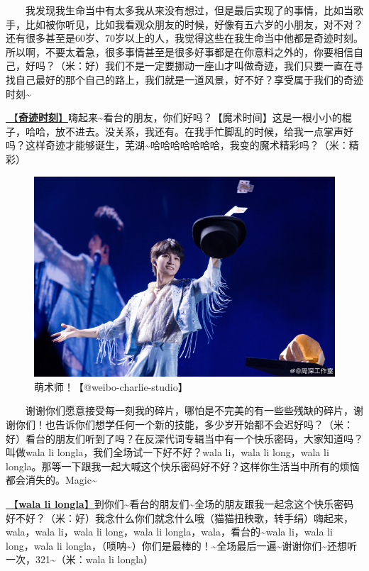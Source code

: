 \documentclass[]{ctexbook}
\begin{document}
  我发现我生命当中有太多我从来没有想过，但是最后实现了的事情，比如当歌手，比如被你听见，比如我看观众朋友的时候，好像有五六岁的小朋友，对不对？还有很多甚至是60岁、70岁以上的人，我觉得这些在我生命当中他都是奇迹时刻。所以啊，不要太着急，很多事情甚至是很多好事都是在你意料之外的，你要相信自己，好吗？（米：好）我们不是一定要挪动一座山才叫做奇迹，我们只要一直在寻找自己最好的那个自己的路上，我们就是一道风景，好不好？享受属于我们的奇迹时刻\textasciitilde{}

\hyperref[magic-moment]{🎵【\textbf{奇迹时刻}】}嗨起来\textasciitilde 看台的朋友，你们好吗？【魔术时间】这是一根小小的棍子，哈哈，放不进去。没关系，我还有。在我手忙脚乱的时候，给我一点掌声好吗？这样奇迹才能够诞生，芜湖\textasciitilde 哈哈哈哈哈哈哈，我变的魔术精彩吗？（米：精彩）

\begin{figure}

{\centering \includegraphics[width=400pt]{img/shenyang20240907/001} 

}

\caption{萌术师！【@weibo-charlie-studio】}\label{fig:unnamed-chunk-92}
\end{figure}

  谢谢你们愿意接受每一刻我的碎片，哪怕是不完美的有一些些残缺的碎片，谢谢你们！也告诉你们想学任何一个新的技能，多少岁开始都不会迟好吗？（米：好）看台的朋友们听到了吗？在反深代词专辑当中有一个快乐密码，大家知道吗？叫做wala li longla，我们全场试一下好不好？wala li，wala li long，wala li longla。那等一下跟我一起大喊这个快乐密码好不好？这样你生活当中所有的烦恼都会消失的。Magic\textasciitilde{}

\hyperref[wala-li-longla]{🎵【\textbf{wala li longla}】}到你们\textasciitilde 看台的朋友们\textasciitilde 全场的朋友跟我一起念这个快乐密码好不好？（米：好）我念什么你们就念什么哦（猫猫扭秧歌，转手绢）嗨起来，wala，wala li，wala li long，wala li longla，wala，看台的\textasciitilde wala li，wala li long，wala li longla，（唢呐\textasciitilde）你们是最棒的！\textasciitilde 全场最后一遍\textasciitilde 谢谢你们\textasciitilde 还想听一次，321\textasciitilde（米：wala li longla）
\end{document}
